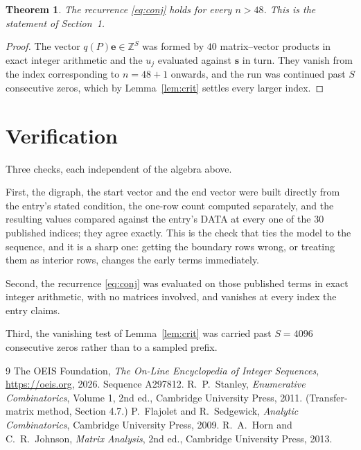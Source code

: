\documentclass[11pt,a4paper]{article}
\theoremstyle{plain}
\newtheorem{theorem}{Theorem}
\theoremstyle{definition}
\begin{document}
\begin{theorem}
The recurrence \eqref{eq:conj} holds for every $n>48$. This is the statement of
Section~1.
\end{theorem}

\begin{proof}
The vector $q(P)\mathbf{e}\in\mathbb{Z}^{S}$ was formed by $40$ matrix--vector
products in exact integer arithmetic and the $u_j$ evaluated against $\mathbf{s}$ in turn.
They vanish from the index corresponding to $n=48+1$ onwards, and the run was continued
past $S$ consecutive zeros, which by Lemma~\ref{lem:crit} settles every larger index.
\end{proof}

\section{Verification}

Three checks, each independent of the algebra above.

First, the digraph, the start vector and the end vector were built directly from the
entry's stated condition, the one-row count computed separately, and the resulting values
compared against the entry's DATA at every one of the $30$ published indices; they
agree exactly. This is the check that ties the model to the sequence, and it is a sharp one:
getting the boundary rows wrong, or treating them as interior rows, changes the early terms
immediately.

Second, the recurrence \eqref{eq:conj} was evaluated on those published terms in exact
integer arithmetic, with no matrices involved, and vanishes at every index the entry claims.

Third, the vanishing test of Lemma~\ref{lem:crit} was carried past $S=4096$ consecutive
zeros rather than to a sampled prefix.

\begin{thebibliography}{9}
 The OEIS Foundation, \emph{The On-Line Encyclopedia of Integer
Sequences}, \url{https://oeis.org}, 2026. Sequence A297812.
 R.~P.~Stanley, \emph{Enumerative Combinatorics}, Volume 1, 2nd ed.,
Cambridge University Press, 2011. (Transfer-matrix method, Section 4.7.)
 P.~Flajolet and R.~Sedgewick, \emph{Analytic Combinatorics}, Cambridge
University Press, 2009.
 R.~A.~Horn and C.~R.~Johnson, \emph{Matrix Analysis}, 2nd ed., Cambridge
University Press, 2013.
\end{thebibliography}
\end{document}
